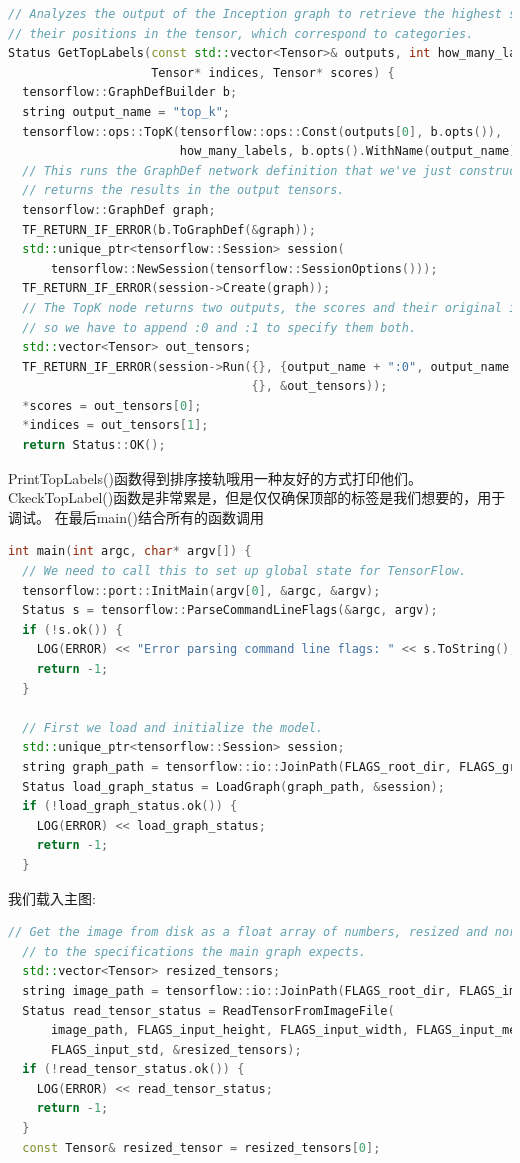 \begin{lstlisting}[language=C++]
// Analyzes the output of the Inception graph to retrieve the highest scores and
// their positions in the tensor, which correspond to categories.
Status GetTopLabels(const std::vector<Tensor>& outputs, int how_many_labels,
                    Tensor* indices, Tensor* scores) {
  tensorflow::GraphDefBuilder b;
  string output_name = "top_k";
  tensorflow::ops::TopK(tensorflow::ops::Const(outputs[0], b.opts()),
                        how_many_labels, b.opts().WithName(output_name));
  // This runs the GraphDef network definition that we've just constructed, and
  // returns the results in the output tensors.
  tensorflow::GraphDef graph;
  TF_RETURN_IF_ERROR(b.ToGraphDef(&graph));
  std::unique_ptr<tensorflow::Session> session(
      tensorflow::NewSession(tensorflow::SessionOptions()));
  TF_RETURN_IF_ERROR(session->Create(graph));
  // The TopK node returns two outputs, the scores and their original indices,
  // so we have to append :0 and :1 to specify them both.
  std::vector<Tensor> out_tensors;
  TF_RETURN_IF_ERROR(session->Run({}, {output_name + ":0", output_name + ":1"},
                                  {}, &out_tensors));
  *scores = out_tensors[0];
  *indices = out_tensors[1];
  return Status::OK();
\end{lstlisting}
PrintTopLabels()函数得到排序接轨哦用一种友好的方式打印他们。CkeckTopLabel()函数是非常累是，但是仅仅确保顶部的标签是我们想要的，用于调试。
在最后main()结合所有的函数调用
\begin{lstlisting}[language=C++]
int main(int argc, char* argv[]) {
  // We need to call this to set up global state for TensorFlow.
  tensorflow::port::InitMain(argv[0], &argc, &argv);
  Status s = tensorflow::ParseCommandLineFlags(&argc, argv);
  if (!s.ok()) {
    LOG(ERROR) << "Error parsing command line flags: " << s.ToString();
    return -1;
  }

  // First we load and initialize the model.
  std::unique_ptr<tensorflow::Session> session;
  string graph_path = tensorflow::io::JoinPath(FLAGS_root_dir, FLAGS_graph);
  Status load_graph_status = LoadGraph(graph_path, &session);
  if (!load_graph_status.ok()) {
    LOG(ERROR) << load_graph_status;
    return -1;
  }
\end{lstlisting}
我们载入主图:
\begin{lstlisting}[language=C++]
 // Get the image from disk as a float array of numbers, resized and normalized
  // to the specifications the main graph expects.
  std::vector<Tensor> resized_tensors;
  string image_path = tensorflow::io::JoinPath(FLAGS_root_dir, FLAGS_image);
  Status read_tensor_status = ReadTensorFromImageFile(
      image_path, FLAGS_input_height, FLAGS_input_width, FLAGS_input_mean,
      FLAGS_input_std, &resized_tensors);
  if (!read_tensor_status.ok()) {
    LOG(ERROR) << read_tensor_status;
    return -1;
  }
  const Tensor& resized_tensor = resized_tensors[0];
\end{lstlisting}
